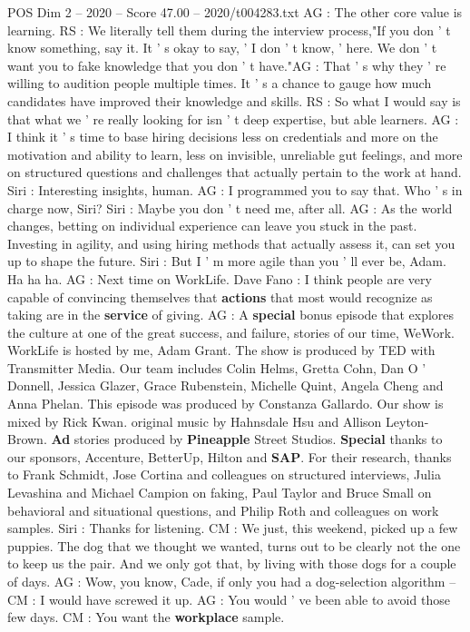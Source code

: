 \begin{textsample}{POS Dim 2 – 2020 – Score 47.00 – 2020/t004283.txt}
AG : The other core value is learning.
RS : We literally tell them during the interview process,"If you don ' t know something, say it.
It ' s okay to say, ' I don ' t know, ' here.
We don ' t want you to fake knowledge that you don ' t have."AG : That ' s why they ' re willing to audition people multiple times.
It ' s a chance to gauge how much candidates have improved their knowledge and skills.
RS : So what I would say is that what we ' re really looking for isn ' t deep expertise, but able learners.
AG : I think it ' s time to base hiring decisions less on credentials and more on the motivation and ability to learn, less on invisible, unreliable gut feelings, and more on structured questions and challenges that actually pertain to the work at hand.
Siri : Interesting insights, human.
AG : I programmed you to say that.
Who ' s in charge now, Siri?
Siri : Maybe you don ' t need me, after all.
AG : As the world changes, betting on individual experience can leave you stuck in the past.
Investing in agility, and using hiring methods that actually assess it, can set you up to shape the future.
Siri : But I ' m more agile than you ' ll ever be, Adam.
Ha ha ha.
AG : Next time on WorkLife.
Dave Fano : I think people are very capable of convincing themselves that \textbf{actions} that most would recognize as taking are in the \textbf{service} of giving.
AG : A \textbf{special} bonus episode that explores the culture at one of the great success, and failure, stories of our time, WeWork.
WorkLife is hosted by me, Adam Grant.
The show is produced by TED with Transmitter Media.
Our team includes Colin Helms, Gretta Cohn, Dan O ' Donnell, Jessica Glazer, Grace Rubenstein, Michelle Quint, Angela Cheng and Anna Phelan.
This episode was produced by Constanza Gallardo.
Our show is mixed by Rick Kwan. original music by Hahnsdale Hsu and Allison Leyton-Brown. \textbf{Ad} stories produced by \textbf{Pineapple} Street Studios. \textbf{Special} thanks to our sponsors, Accenture, BetterUp, Hilton and \textbf{SAP}.
For their research, thanks to Frank Schmidt, Jose Cortina and colleagues on structured interviews, Julia Levashina and Michael Campion on faking, Paul Taylor and Bruce Small on behavioral and situational questions, and Philip Roth and colleagues on work samples.
Siri : Thanks for listening.
CM : We just, this weekend, picked up a few puppies.
The dog that we thought we wanted, turns out to be clearly not the one to keep us the pair.
And we only got that, by living with those dogs for a couple of days.
AG : Wow, you know, Cade, if only you had a dog-selection algorithm -- CM : I would have screwed it up.
AG : You would ' ve been able to avoid those few days.
CM : You want the \textbf{workplace} sample.

\end{textsample}
